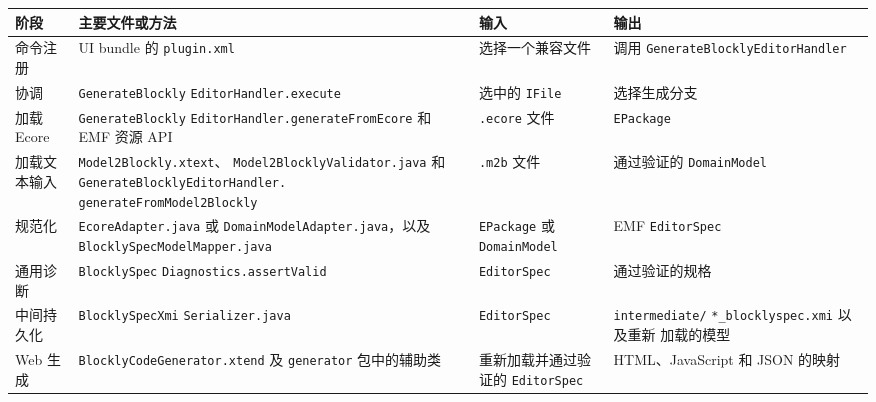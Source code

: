 \begin{table}[htbp]
  \centering
  \footnotesize
  \setlength{\tabcolsep}{4pt}
  \renewcommand{\arraystretch}{1.08}
  \begin{tabular}{@{}
      >{\raggedright\arraybackslash}p{}
      >{\raggedright\arraybackslash}p{}
      >{\raggedright\arraybackslash}p{}
      >{\raggedright\arraybackslash}p{}@{}}
    \toprule
    阶段 & 主要文件或方法 & 输入 & 输出 \\
    \midrule
    命令注册 & UI bundle 的 \texttt{plugin.xml} &
    选择一个兼容文件 & 调用
    \texttt{GenerateBlockly}\allowbreak\texttt{EditorHandler} \\

    协调 & \texttt{GenerateBlockly}\allowbreak
    \texttt{EditorHandler.}\allowbreak\texttt{execute} &
    选中的 \texttt{IFile} & 选择生成分支 \\

    加载 Ecore & \texttt{GenerateBlockly}\allowbreak
    \texttt{EditorHandler.}\allowbreak\texttt{generateFromEcore} 和 EMF
    资源 API &
    \texttt{.ecore} 文件 & \texttt{EPackage} \\

    加载文本输入 & \texttt{Model2Blockly.xtext}、
    \texttt{Model2Blockly}\allowbreak\texttt{Validator.java} 和
    \texttt{GenerateBlockly}\allowbreak\texttt{EditorHandler.}
    \allowbreak\texttt{generateFrom}\allowbreak\texttt{Model2Blockly} &
    \texttt{.m2b} 文件 & 通过验证的 \texttt{DomainModel} \\

    规范化 & \texttt{EcoreAdapter.java} 或
    \texttt{DomainModelAdapter.java}，以及
    \texttt{BlocklySpec}\allowbreak\texttt{ModelMapper.java} &
    \texttt{EPackage} 或 \texttt{DomainModel} & EMF \texttt{EditorSpec} \\

    通用诊断 & \texttt{BlocklySpec}\allowbreak
    \texttt{Diagnostics.}\allowbreak\texttt{assertValid} &
    \texttt{EditorSpec} & 通过验证的规格 \\

    中间持久化 & \texttt{BlocklySpecXmi}\allowbreak
    \texttt{Serializer.java} &
    \texttt{EditorSpec} & \texttt{intermediate/}
    \allowbreak\texttt{*\_blockly}\allowbreak\texttt{spec.xmi} 以及重新
    加载的模型 \\

    Web 生成 & \texttt{BlocklyCodeGenerator.xtend} 及
    \texttt{generator} 包中的辅助类 & 重新加载并通过验证的
    \texttt{EditorSpec} & HTML、JavaScript 和 JSON 的映射 \\


\end{tabular}
\end{table}
